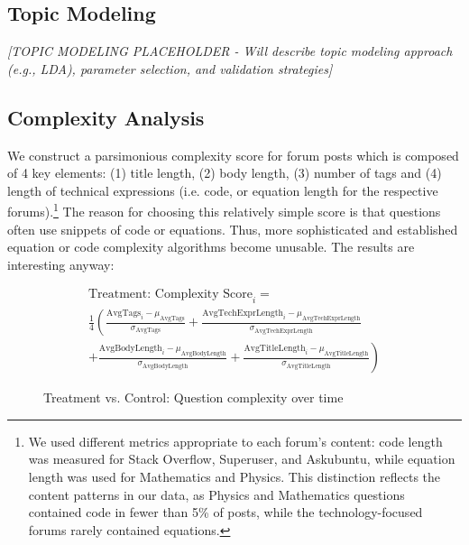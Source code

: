 
\subsection{Topic Modeling}
\textit{[TOPIC MODELING PLACEHOLDER - Will describe topic modeling approach (e.g., LDA), parameter selection, and validation strategies]}


\subsection{Complexity Analysis}

We construct a parsimonious complexity score for forum posts which is composed of 4 key elements: (1) title length, (2) body length, (3) number of tags and (4) length of technical expressions (i.e. code, or equation length for the respective forums).\footnote{We used different metrics appropriate to each forum's content: code length was measured for Stack Overflow, Superuser, and Askubuntu, while equation length was used for Mathematics and Physics. This distinction reflects the content patterns in our data, as Physics and Mathematics questions contained code in fewer than 5\% of posts, while the technology-focused forums rarely contained equations.} The reason for choosing this relatively simple score is that questions often use snippets of code or equations. Thus, more sophisticated and established equation or code complexity algorithms become unusable. The results are interesting anyway:

\begin{multline}\label{eq:cscore}
    \text{Treatment: Complexity Score}_i = \\
    \frac{1}{4} \left( \frac{\text{AvgTags}_i - \mu_{\text{AvgTags}}}{\sigma_{\text{AvgTags}}} + \frac{\text{AvgTechExprLength}_i - \mu_{\text{AvgTechExprLength}}}{\sigma_{\text{AvgTechExprLength}}} \right. \\
    \left. + \frac{\text{AvgBodyLength}_i - \mu_{\text{AvgBodyLength}}}{\sigma_{\text{AvgBodyLength}}} + \frac{\text{AvgTitleLength}_i - \mu_{\text{AvgTitleLength}}}{\sigma_{\text{AvgTitleLength}}} \right)
\end{multline}

\begin{figure}[H]
    \centering
    
    \caption{Treatment vs. Control: Question complexity over time}
    \label{fig:complex}
\end{figure}


